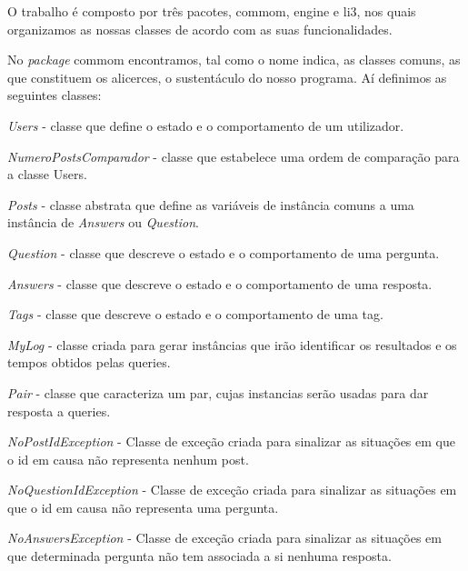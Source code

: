 \documentclass[a4paper]{article}
\begin{document}
O trabalho é composto por três pacotes, commom, engine e li3, nos quais organizamos
as nossas classes de acordo com as suas funcionalidades. \par
No \textit{package} commom
encontramos, tal como o nome indica, as classes comuns, as que constituem
os alicerces, o sustentáculo do nosso programa. Aí definimos as seguintes classes:
\begin{itemize}
\begin{item} \textit{Users} - classe que define o estado e o comportamento de um
 utilizador.\end{item}
\begin{item} \textit{NumeroPostsComparador} - classe que estabelece uma ordem de
comparação para a classe Users.\end{item}
\begin{item} \textit{Posts} - classe abstrata que define as variáveis de instância
comuns a uma instância de \textit{Answers} ou \textit{Question}.\end{item}
\begin{item} \textit{Question} - classe que descreve o estado e o comportamento de
uma pergunta.\end{item}
\begin{item} \textit{Answers} - classe que descreve o estado e o comportamento de
uma resposta.\end{item}
\begin{item} \textit{Tags} - classe que descreve o estado e o comportamento de
uma tag.\end{item}
\begin{item} \textit{MyLog} - classe criada para gerar instâncias que irão
identificar os resultados e os tempos obtidos pelas queries.\end{item}
\begin{item} \textit{Pair} - classe que caracteriza um par, cujas instancias
serão usadas para dar resposta a queries.\end{item}
\begin{item} \textit{NoPostIdException} - Classe de exceção criada para sinalizar
as situações em que o id em causa não representa nenhum post.\end{item}
\begin{item} \textit{NoQuestionIdException} - Classe de exceção criada para sinalizar
as situações em que o id em causa não representa uma pergunta.\end{item}
\begin{item} \textit{NoAnswersException} - Classe de exceção criada para sinalizar
as situações em que determinada pergunta não tem associada a si nenhuma resposta.\end{item}
\end{itemize}
\end{document}
